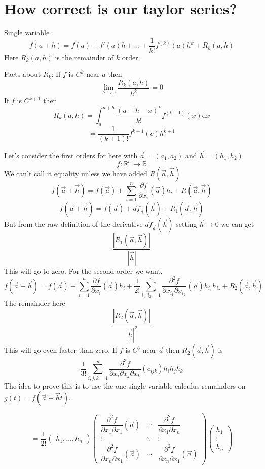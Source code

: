 \documentclass[letter]{article}
\renewcommand{\frac}{\dfrac}
\begin{document}
\section*{How correct is our taylor series? }
Single variable 
\[
f(a+h) = f(a) + f'(a) h + 
\ldots + 
\frac{1}{k!} f^{(k)} (a) h^{k} + R_k(a,h)
\]
Here $R_k(a,h)$ is the remainder of $k$ order. 

Facts about $R_k$: If $f$ is $C^{k}$ near $a$ then 
\[
\lim_{h \to 0} \frac{R_k(a,h)}{h^{k}} = 0
\]
If $f $ is $C^{k+1}$ then 
\[
R_k(a,h) = \int_a^{a+h} \frac{(a+h - x)^{k} }{k!} f^{(k+1)} (x) \mathrm{d} x
\]
\[
= \frac{1}{(k+1)!} f^{k+1}(c) h^{k+1}
\] 

Let's consider the first orders for here with $\vec{a} = (a_1,a_2)$ and $\vec{h}=(h_1,h_2)$
\[
f:\mathbb{R}^{n} \to \mathbb{R}
\]
We can't call it equality unless we have added $R(\vec{a},\vec{h})$
\[
f(\vec{a}+\vec{h}) = f(\vec{a}) + \sum_{i = 1}^{n} \frac{\partial f}{\partial x_i}(\vec{a}) h_i + R(\vec{a},\vec{h})
\] 
\[
	f(\vec{a}+\vec{h}) = f(\vec{a}) + df_{\vec{a}}(\vec{h})+ R_1(\vec{a},\vec{h})
\]
But from the raw definition of the derivative $df_{\vec{a}} (\vec{h})$ setting $\vec{h}\to 0$ we can get 
\[
\frac{\left| R_1(\vec{a},\vec{h})\right|}{\left|\vec{h}\right|}
\] This will go to zero. 
For the second order we want, 
\[
f(\vec{a}+\vec{h}) = f(\vec{a}) + \sum_{i = 1}^{n} \frac{\partial f}{\partial x_i}(\vec{a}) h_i + 
\frac{1}{2!} \sum_{i_1,i_2=1}^{n} \frac{\partial^2 f}{\partial x_{i_1} \partial x_{i_2} } (\vec{a}) h_{i_1} h_{i_2} + R_2(\vec{a},\vec{h})
\] 
The remainder here 
\[
\frac{\left| R_2(\vec{a},\vec{h})\right|}{\left|\vec{h}\right|^2}
\]This will go even faster than zero. If $f$ is $C^{3}$ near $\vec{a}$ then $R_2(\vec{a},\vec{h})$ is $$\frac{1}{3!} \sum_{i,j,k=1}^{n} 
\frac{\partial ^3 f}{\partial x_i \partial x_j \partial x_k} (c_{ijk}) h_i h_j h_k$$
The idea to prove this is to use the one single variable calculus remainders on $g(t) = f(\vec{a}+\vec{h}t)$. 

\[
= \frac{1}{2!} \begin{pmatrix} h_1, \ldots, h_n \end{pmatrix} 
\begin{pmatrix} \dfrac{\partial ^2 f}{\partial x_1 \partial x_1}(\vec{a}) & \cdots & \dfrac{\partial ^2 f}{ \partial x_1 \partial x_n} \\ 
\vdots & \ddots & \vdots \\ 
\frac{\partial^2 f}{\partial x_n \partial x_1}(\vec{a}) & \cdots & \frac{\partial^2 f}{\partial x_n \partial x_1}(\vec{a}) 
\end{pmatrix}
\begin{pmatrix} h_1 \\ \vdots \\ h_n \end{pmatrix} 
\] 
\end{document}
